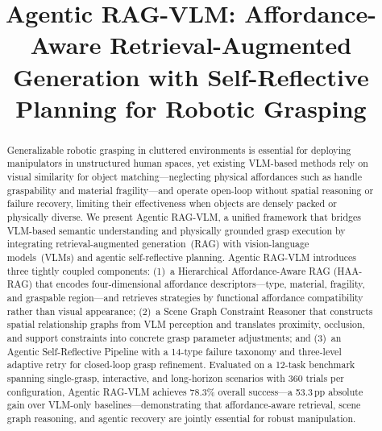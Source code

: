 \documentclass[letterpaper, 10pt, conference]{ieeeconf}
\newcommand{\sysname}{Agentic RAG-VLM}
\newcommand{\haarag}{HAA-RAG}
\begin{document}
\title{\LARGE \bf Agentic RAG-VLM: Affordance-Aware Retrieval-Augmented\\Generation with Self-Reflective Planning for Robotic Grasping}

\author{}

\maketitle
\thispagestyle{empty}
\pagestyle{empty}

\begin{abstract}
Generalizable robotic grasping in cluttered environments is essential for deploying manipulators in unstructured human spaces, yet existing VLM-based methods rely on visual similarity for object matching---neglecting physical affordances such as handle graspability and material fragility---and operate open-loop without spatial reasoning or failure recovery, limiting their effectiveness when objects are densely packed or physically diverse.
We present \sysname{}, a unified framework that bridges VLM-based semantic understanding and physically grounded grasp execution by integrating retrieval-augmented generation~(RAG) with vision-language models~(VLMs) and agentic self-reflective planning.
\sysname{} introduces three tightly coupled components:
(1)~a Hierarchical Affordance-Aware RAG (\haarag{}) that encodes four-dimensional affordance descriptors---type, material, fragility, and graspable region---and retrieves strategies by functional affordance compatibility rather than visual appearance;
(2)~a Scene Graph Constraint Reasoner that constructs spatial relationship graphs from VLM perception and translates proximity, occlusion, and support constraints into concrete grasp parameter adjustments;
and (3)~an Agentic Self-Reflective Pipeline with a 14-type failure taxonomy and three-level adaptive retry for closed-loop grasp refinement.
Evaluated on a 12-task benchmark spanning single-grasp, interactive, and long-horizon scenarios with 360 trials per configuration, \sysname{} achieves 78.3\% overall success---a 53.3\,pp absolute gain over VLM-only baselines---demonstrating that affordance-aware retrieval, scene graph reasoning, and agentic recovery are jointly essential for robust manipulation.
\end{abstract}
\end{document}
